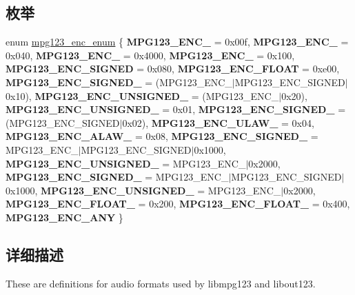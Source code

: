 \subsection*{枚举}
\begin{DoxyCompactItemize}
\item 
enum \hyperlink{group__mpg123__enc_gafc8cdd60a8d3c30a09249869d835c634}{mpg123\+\_\+enc\+\_\+enum} \{ \newline
{\bfseries M\+P\+G123\+\_\+\+E\+N\+C\+\_} = 0x00f, 
{\bfseries M\+P\+G123\+\_\+\+E\+N\+C\+\_} = 0x040, 
{\bfseries M\+P\+G123\+\_\+\+E\+N\+C\+\_} = 0x4000, 
{\bfseries M\+P\+G123\+\_\+\+E\+N\+C\+\_} = 0x100, 
\newline
{\bfseries M\+P\+G123\+\_\+\+E\+N\+C\+\_\+\+S\+I\+G\+N\+ED} = 0x080, 
{\bfseries M\+P\+G123\+\_\+\+E\+N\+C\+\_\+\+F\+L\+O\+AT} = 0xe00, 
{\bfseries M\+P\+G123\+\_\+\+E\+N\+C\+\_\+\+S\+I\+G\+N\+E\+D\+\_} = (M\+P\+G123\+\_\+\+E\+N\+C\+\_$\vert$\+M\+P\+G123\+\_\+\+E\+N\+C\+\_\+\+S\+I\+G\+N\+E\+D$\vert$0x10), 
{\bfseries M\+P\+G123\+\_\+\+E\+N\+C\+\_\+\+U\+N\+S\+I\+G\+N\+E\+D\+\_} = (M\+P\+G123\+\_\+\+E\+N\+C\+\_$\vert$0x20), 
\newline
{\bfseries M\+P\+G123\+\_\+\+E\+N\+C\+\_\+\+U\+N\+S\+I\+G\+N\+E\+D\+\_} = 0x01, 
{\bfseries M\+P\+G123\+\_\+\+E\+N\+C\+\_\+\+S\+I\+G\+N\+E\+D\+\_} = (M\+P\+G123\+\_\+\+E\+N\+C\+\_\+\+S\+I\+G\+N\+E\+D$\vert$0x02), 
{\bfseries M\+P\+G123\+\_\+\+E\+N\+C\+\_\+\+U\+L\+A\+W\+\_} = 0x04, 
{\bfseries M\+P\+G123\+\_\+\+E\+N\+C\+\_\+\+A\+L\+A\+W\+\_} = 0x08, 
\newline
{\bfseries M\+P\+G123\+\_\+\+E\+N\+C\+\_\+\+S\+I\+G\+N\+E\+D\+\_} = M\+P\+G123\+\_\+\+E\+N\+C\+\_$\vert$\+M\+P\+G123\+\_\+\+E\+N\+C\+\_\+\+S\+I\+G\+N\+E\+D$\vert$0x1000, 
{\bfseries M\+P\+G123\+\_\+\+E\+N\+C\+\_\+\+U\+N\+S\+I\+G\+N\+E\+D\+\_} = M\+P\+G123\+\_\+\+E\+N\+C\+\_$\vert$0x2000, 
{\bfseries M\+P\+G123\+\_\+\+E\+N\+C\+\_\+\+S\+I\+G\+N\+E\+D\+\_} = M\+P\+G123\+\_\+\+E\+N\+C\+\_$\vert$\+M\+P\+G123\+\_\+\+E\+N\+C\+\_\+\+S\+I\+G\+N\+E\+D$\vert$0x1000, 
{\bfseries M\+P\+G123\+\_\+\+E\+N\+C\+\_\+\+U\+N\+S\+I\+G\+N\+E\+D\+\_} = M\+P\+G123\+\_\+\+E\+N\+C\+\_$\vert$0x2000, 
\newline
{\bfseries M\+P\+G123\+\_\+\+E\+N\+C\+\_\+\+F\+L\+O\+A\+T\+\_} = 0x200, 
{\bfseries M\+P\+G123\+\_\+\+E\+N\+C\+\_\+\+F\+L\+O\+A\+T\+\_} = 0x400, 
{\bfseries M\+P\+G123\+\_\+\+E\+N\+C\+\_\+\+A\+NY}
 \}
\end{DoxyCompactItemize}


\subsection{详细描述}
These are definitions for audio formats used by libmpg123 and libout123. 

